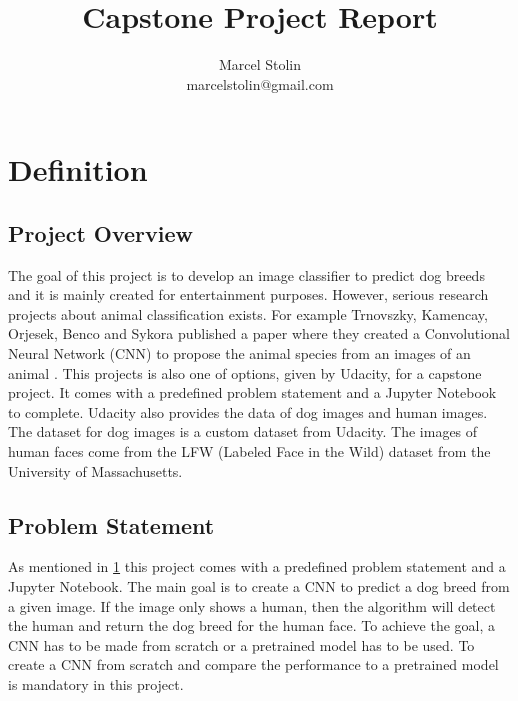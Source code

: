 \documentclass{article}
\title{Capstone Project Report}
\date{}
\author{Marcel Stolin \\ marcelstolin@gmail.com}
\begin{document}
\maketitle

\section{Definition} \label{s_definition}

\subsection{Project Overview}
The goal of this project is to develop an image classifier to predict dog breeds and it is mainly created for entertainment purposes. However, serious research projects about animal classification exists. For example Trnovszky, Kamencay, Orjesek, Benco and Sykora published a paper where they created a Convolutional Neural Network (CNN) to propose the animal species from an images of an animal \cite{animal_rec}.\newline
This projects is also one of options, given by Udacity, for a capstone project. It comes with a predefined problem statement and a Jupyter Notebook to complete. Udacity also provides the data of dog images and human images. The dataset for dog images is a custom dataset from Udacity. The images of human faces come from the LFW (Labeled Face in the Wild) \cite{lfw} dataset from the University of Massachusetts.

\subsection{Problem Statement}
As mentioned in \ref{s_definition} this project comes with a predefined problem statement and a Jupyter Notebook. The main goal is to create a CNN to predict a dog breed from a given image. If the image only shows a human, then the algorithm will detect the human and return the dog breed for the human face. To achieve the goal, a CNN has to be made from scratch or a pretrained model has to be used. To create a CNN from scratch and compare the performance to a pretrained model is mandatory in this project.\newline
\end{document}
